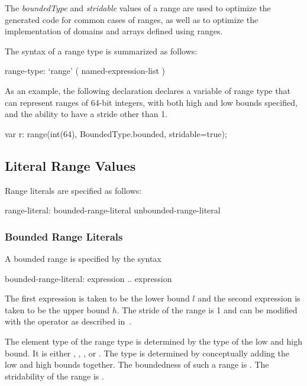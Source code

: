 \begin{rationale}
The \emph{boundedType} and \emph{stridable} values of a range are used
to optimize the generated code for common cases of ranges, as well as
to optimize the implementation of domains and arrays defined using
ranges.
\end{rationale}

The syntax of a range type is summarized as follows:
\begin{syntax}
range-type:
  `range' ( named-expression-list )
\end{syntax}

\begin{example}
As an example, the following declaration declares a variable 
of range type that can represent ranges of 64-bit integers, with both
high and low bounds specified, and the ability to have a stride other
than 1.
\begin{chapel}
var r: range(int(64), BoundedType.bounded, stridable=true);
\end{chapel}
\end{example}

\subsection{Literal Range Values}
\label{Range_Literals}

Range literals are specified as follows:
\begin{syntax}
range-literal:
  bounded-range-literal
  unbounded-range-literal
\end{syntax}

\subsubsection{Bounded Range Literals}
\label{Bounded_Ranges}

A bounded range is specified by the syntax
\begin{syntax}
bounded-range-literal:
  expression .. expression
\end{syntax}
The first expression is taken to be the lower bound $l$ and the second
expression is taken to be the upper bound $h$.  The stride of the
range is 1 and can be modified with the  operator as described
in~.

The element type of the range type is determined by the type of the
low and high bound.  It is either , ,
, or .  The type is determined by
conceptually adding the low and high bounds together.  The boundedness
of such a range is .  The stridability of
the range is .

